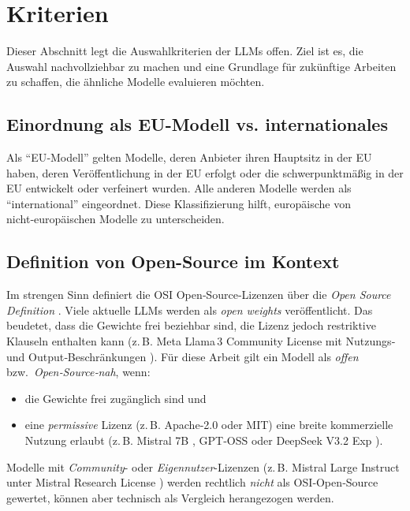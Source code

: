 \section{Kriterien}\label{sec:kriterien}

Dieser Abschnitt legt die Auswahlkriterien der \acp{LLM} offen. Ziel ist es, die Auswahl nachvollziehbar zu machen und eine Grundlage für zukünftige Arbeiten zu schaffen, die ähnliche Modelle evaluieren möchten.

\subsection*{Einordnung als \ac{EU}-Modell vs. internationales}

Als \enquote{\ac{EU}‑Modell} gelten Modelle, deren Anbieter ihren Hauptsitz in der \ac{EU} haben, deren Veröffentlichung in der \ac{EU} erfolgt oder die schwerpunktmäßig in der \ac{EU} entwickelt oder verfeinert wurden. Alle anderen Modelle werden als \enquote{international} eingeordnet. Diese Klassifizierung hilft, europäische von nicht‑europäischen Modelle zu unterscheiden.

\subsection*{Definition von Open-Source im Kontext}

Im strengen Sinn definiert die \ac{OSI} Open‑Source‑Lizenzen über die \emph{Open Source Definition} \cite{OSI_OSD}. Viele aktuelle \acp{LLM} werden als \emph{open weights} veröffentlicht. Das beudetet, dass die Gewichte frei beziehbar sind, die Lizenz jedoch restriktive Klauseln enthalten kann (z.\,B. Meta Llama\,3 Community License mit Nutzungs‑ und Output‑Beschränkungen \cite{Llama3_License}). Für diese Arbeit gilt ein Modell als \emph{offen} bzw.\ \emph{Open‑Source‑nah}, wenn:

\begin{itemize}
    \item die Gewichte frei zugänglich sind und
    \item eine \emph{permissive} Lizenz (z.\,B. Apache‑2.0 oder MIT) eine breite kommerzielle Nutzung erlaubt (z.\,B. Mistral 7B \cite{HF_Mistral7B_2025}, GPT‑OSS \cite{OpenAI_GPTOSS_ModelCard_2025, OpenAI_GPTOSS_Blog_2025} oder DeepSeek V3.2 Exp \cite{HF_DeepSeekR1_2025}).
\end{itemize}

Modelle mit \emph{Community}- oder \emph{Eigennutzer}-Lizenzen (z.\,B. Mistral Large Instruct unter Mistral Research License \cite{MRL_Research_License, HF_MistralLargeInstruct_2025}) werden rechtlich \emph{nicht} als \ac{OSI}‑Open‑Source gewertet, können aber technisch als Vergleich herangezogen werden.

